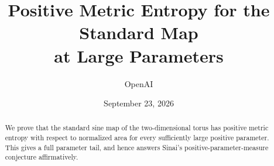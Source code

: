 \documentclass[11pt]{article}
\title{Positive Metric Entropy for the Standard Map\\at Large Parameters}
\author{OpenAI}
\date{September 23, 2026}
\numberwithin{equation}{section}
\theoremstyle{definition}
\theoremstyle{remark}
\begin{document}
\maketitle
\begin{abstract}
We prove that the standard sine map of the two-dimensional torus has
positive metric entropy with respect to normalized area for every
sufficiently large positive parameter. This gives a full parameter tail,
and hence answers Sinai's positive-parameter-measure conjecture
affirmatively.
\end{abstract}
\tableofcontents








\end{document}

